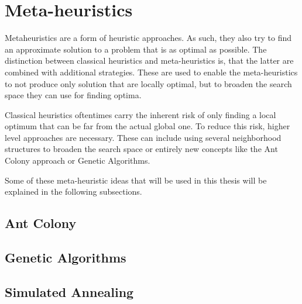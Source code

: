 \section{Meta-heuristics}
\label{sec:metaHeuristics}

Metaheuristics are a form of heuristic approaches.
As such, they also try to find an approximate solution to a problem that is as optimal as possible.
The distinction between classical heuristics and meta-heuristics is, that the latter are combined with additional strategies.
These are used to enable the meta-heuristics to not produce only solution that are locally optimal, but to broaden the search space they can use for finding optima.

Classical heuristics oftentimes carry the inherent risk of only finding a local optimum that can be far from the actual global one.
To reduce this risk, higher level approaches are necessary.
These can include using several neighborhood structures to broaden the search space or entirely new concepts like the Ant Colony approach or Genetic Algorithms. \cite{gendreauHandbookMetaheuristics2010}

Some of these meta-heuristic ideas that will be used in this thesis will be explained in the following subsections.



\subsection{Ant Colony}
\label{subsec:antColonyBackground}

\subsection{Genetic Algorithms}
\label{subsec:geneticAlgorithmsBackground}

\subsection{Simulated Annealing}
\label{subsec:simulatedAnnealingBackground}